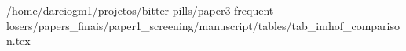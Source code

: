/home/darciogm1/projetos/bitter-pills/paper3-frequent-losers/papers_finais/paper1_screening/manuscript/tables/tab_imhof_comparison.tex